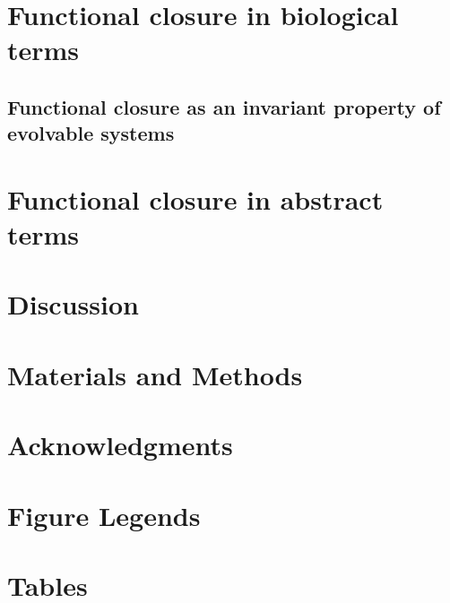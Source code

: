 \documentclass[10pt]{article}
\begin{document}
\section*{Functional closure in biological terms}
\subsection*{Functional closure as an invariant property of evolvable systems}

\section*{Functional closure in abstract terms}


\section*{Discussion}

\section*{Materials and Methods}

\section*{Acknowledgments}





\section*{Figure Legends}


\section*{Tables}
%
%
%
%
\end{document}
